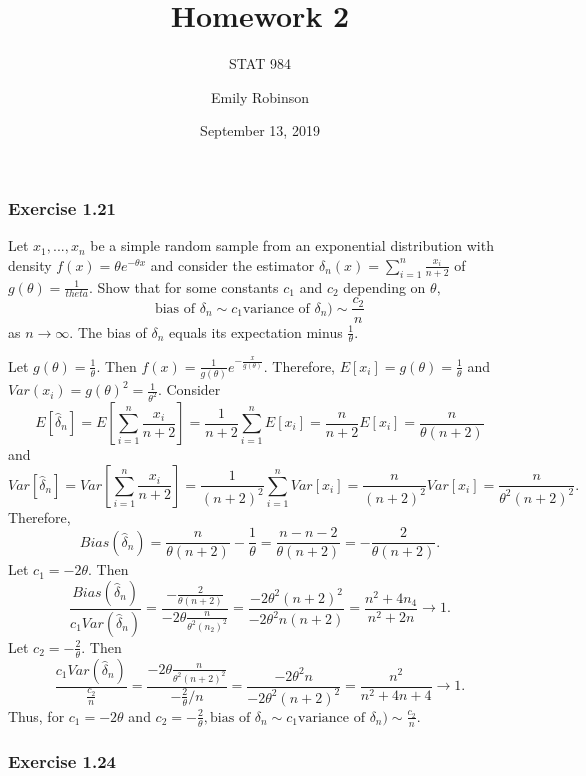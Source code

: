 \documentclass[12pt,]{article}
\title{Homework 2}
\subtitle{STAT 984}
\author{Emily Robinson}
\date{September 13, 2019}
\begin{document}
\maketitle

\hypertarget{exercise-1.21}{%
\subsubsection{Exercise 1.21}\label{exercise-1.21}}

Let \(x_1, ..., x_n\) be a simple random sample from an exponential
distribution with density \(f(x) = \theta e^{-\theta x}\) and consider
the estimator \(\delta_n(x) = \sum_{i = 1}^n\frac{x_i}{n+2}\) of
\(g(\theta) = \frac{1}{theta}.\) Show that for some constants \(c_1\)
and \(c_2\) depending on \(\theta,\)
\[\text{bias of } \delta_n\sim c_1 \text{variance of } \delta_n) \sim \frac{c_2}{n}\]
as \(n\rightarrow \infty.\) The bias of \(\delta_n\) equals its
expectation minus \(\frac{1}{\theta}.\)

Let \(g(\theta) = \frac{1}{\theta}.\) Then
\(f(x) = \frac{1}{g(\theta)} e^{-\frac{x}{g(\theta)}}.\) Therefore,
\(E[x_i] = g(\theta) = \frac{1}{\theta}\) and
\(Var(x_i) = g(\theta)^2 = \frac{1}{\theta^2}\). Consider
\[E[\hat{\delta}_n] = E\left[\sum_{i = 1}^n \frac{x_i}{n+2}\right] = \frac{1}{n+2}\sum_{i=1}^nE[x_i] = \frac{n}{n+2}E[x_i]  = \frac{n}{\theta(n+2)}\]
and
\[Var[\hat{\delta}_n] = Var\left[\sum_{i = 1}^n \frac{x_i}{n+2}\right] = \frac{1}{(n+2)^2}\sum_{i=1}^nVar[x_i]= \frac{n}{(n+2)^2}Var[x_i] = \frac{n}{\theta^2(n+2)^2}.\]
Therefore,
\[Bias(\hat{\delta}_n) = \frac{n}{\theta(n+2)}-\frac{1}{\theta}= \frac{n-n-2}{\theta(n+2)}= -\frac{2}{\theta(n+2)}.\]
Let \(c_1 = -2\theta.\) Then
\[\frac{Bias(\hat{\delta}_n)}{c_1 Var(\hat{\delta}_n)} =\frac{-\frac{2}{\theta(n+2)}}{-2\theta\frac{n}{\theta^2(n_2)^2}}=\frac{-2\theta^2(n+2)^2}{-2\theta^2n(n+2)}= \frac{n^2+4n_4}{n^2+2n}\rightarrow 1.\]
Let \(c_2 = -\frac{2}{\theta}.\) Then
\[\frac{c_1Var(\hat{\delta}_n)}{\frac{c_2}{n}} = \frac{-2\theta\frac{n}{\theta^2(n+2)^2}}{-\frac{2}{\theta}/{n}} = \frac{-2\theta^2n}{-2\theta^2(n+2)^2} = \frac{n^2}{n^2+4n+4} \rightarrow 1.\]
Thus, for \(c_1=-2\theta\) and
\(c_2 = -\frac{2}{\theta},\text{bias of } \delta_n\sim c_1 \text{variance of } \delta_n) \sim \frac{c_2}{n}\).

\hypertarget{exercise-1.24}{%
\subsubsection{Exercise 1.24}\label{exercise-1.24}}
\end{document}
